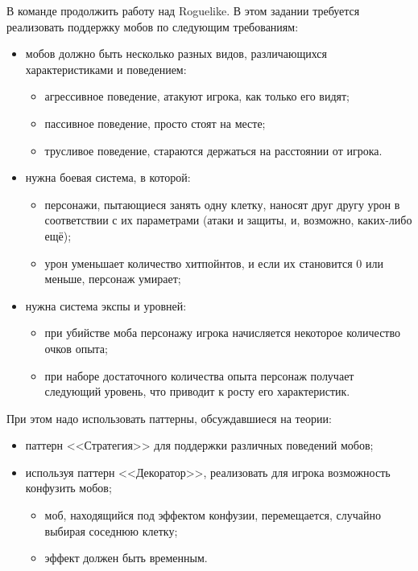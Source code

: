 \documentclass[a5paper]{homework}
\begin{document}

В команде продолжить работу над Roguelike. В этом задании требуется реализовать поддержку мобов по следующим требованиям:

\begin{itemize}
    \item мобов должно быть несколько разных видов, различающихся характеристиками и поведением:
    \begin{itemize}
        \item агрессивное поведение, атакуют игрока, как только его видят;
        \item пассивное поведение, просто стоят на месте;
        \item трусливое поведение, стараются держаться на расстоянии от игрока.
    \end{itemize}
    \item нужна боевая система, в которой:
    \begin{itemize}
        \item персонажи, пытающиеся занять одну клетку, наносят друг другу урон в соответствии с их параметрами (атаки и защиты, и, возможно, каких-либо ещё);
        \item урон уменьшает количество хитпойнтов, и если их становится 0 или меньше, персонаж умирает;
    \end{itemize} 
    \item нужна система экспы и уровней:
    \begin{itemize}
        \item при убийстве моба персонажу игрока начисляется некоторое количество очков опыта;
        \item при наборе достаточного количества опыта персонаж получает следующий уровень, что приводит к росту его характеристик.
    \end{itemize}
\end{itemize}

При этом надо использовать паттерны, обсуждавшиеся на теории:

\begin{itemize}
    \item паттерн <<Стратегия>> для поддержки различных поведений мобов;
    \item используя паттерн <<Декоратор>>, реализовать для игрока возможность конфузить мобов;
    \begin{itemize}
        \item моб, находящийся под эффектом конфузии, перемещается, случайно выбирая соседнюю клетку;
        \item эффект должен быть временным.
    \end{itemize}
\end{itemize}
\end{document}
